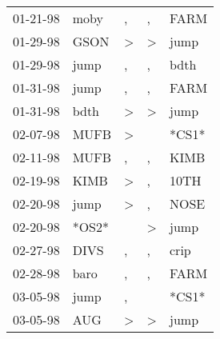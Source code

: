 \begin{supertabular}{p{0.07\textwidth}p{0.06\textwidth}p{0.02\textwidth}p{0.02\textwidth}p{0.06\textwidth}}
          01-21-98\textsuperscript{} &           moby\textsuperscript{} &                , &                , &           FARM\textsuperscript{} \\
          01-29-98\textsuperscript{} &           GSON\textsuperscript{} &     \textgreater &     \textgreater &           jump\textsuperscript{} \\
          01-29-98\textsuperscript{} &           jump\textsuperscript{} &                , &                , &           bdth\textsuperscript{} \\
          01-31-98\textsuperscript{} &           jump\textsuperscript{} &                , &                , &           FARM\textsuperscript{} \\
          01-31-98\textsuperscript{} &           bdth\textsuperscript{} &     \textgreater &     \textgreater &           jump\textsuperscript{} \\
          02-07-98\textsuperscript{} &           MUFB\textsuperscript{} &     \textgreater &                  &                            *CS1* \\
          02-11-98\textsuperscript{} &           MUFB\textsuperscript{} &                , &                , &           KIMB\textsuperscript{} \\
          02-19-98\textsuperscript{} &           KIMB\textsuperscript{} &     \textgreater &                , &           10TH\textsuperscript{} \\
          02-20-98\textsuperscript{} &           jump\textsuperscript{} &     \textgreater &                , &           NOSE\textsuperscript{} \\
          02-20-98\textsuperscript{} &                            *OS2* &                  &     \textgreater &           jump\textsuperscript{} \\
          02-27-98\textsuperscript{} &           DIVS\textsuperscript{} &                , &                , &           crip\textsuperscript{} \\
          02-28-98\textsuperscript{} &           baro\textsuperscript{} &                , &                , &           FARM\textsuperscript{} \\
          03-05-98\textsuperscript{} &           jump\textsuperscript{} &                , &                  &                            *CS1* \\
          03-05-98\textsuperscript{} &            AUG\textsuperscript{} &     \textgreater &     \textgreater &           jump\textsuperscript{} \\

\end{supertabular}
